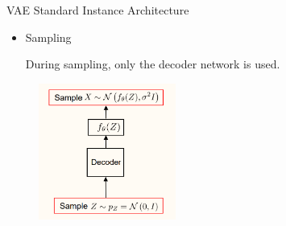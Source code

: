 \begin{frame}[allowframebreaks]
\begin{myconceptblock}{11.19}{VAE Standard Instance Architecture}
    \par\noindent\textcolor{gray}{\hdashrule{\textwidth}{0.4pt}{1pt 2pt}}

    \begin{itemize}
        \item
        Sampling

        During sampling, only the decoder network is used.
    \end{itemize}

    \begin{figure}[H]
        \centering
        \includegraphics[width=0.4\textwidth]{.././assets/11.7.png}
    \end{figure}
\end{myconceptblock}

\end{frame}

